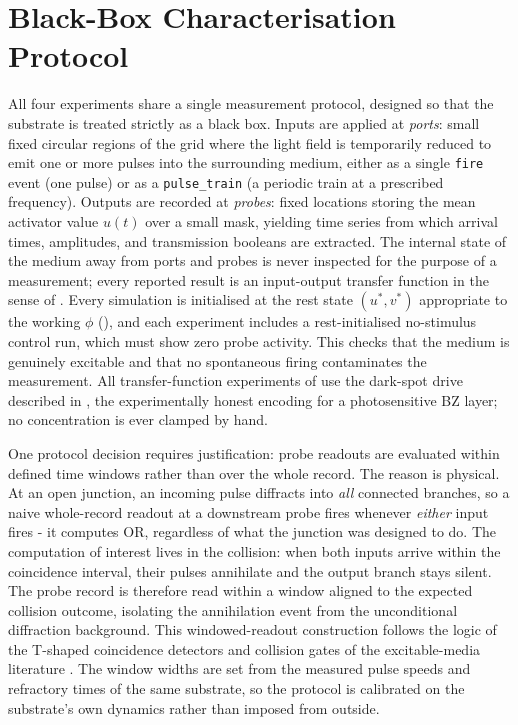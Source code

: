 \section{Black-Box Characterisation Protocol}
\label{sec:meth_protocol}

All four experiments share a single measurement protocol, designed so that the substrate is treated strictly as a black box.
Inputs are applied at \emph{ports}: small fixed circular regions of the grid where the light field is temporarily reduced to emit one or more pulses into the surrounding medium, either as a single \texttt{fire} event (one pulse) or as a \texttt{pulse\_train} (a periodic train at a prescribed frequency).
Outputs are recorded at \emph{probes}: fixed locations storing the mean activator value $u(t)$ over a small mask, yielding time series from which arrival times, amplitudes, and transmission booleans are extracted.
The internal state of the medium away from ports and probes is never inspected for the purpose of a measurement; every reported result is an input-output transfer function in the sense of .
Every simulation is initialised at the rest state $(u^{*}, v^{*})$ appropriate to the working $\phi$ (), and each experiment includes a rest-initialised no-stimulus control run, which must show zero probe activity. This checks that the medium is genuinely excitable and that no spontaneous firing contaminates the measurement.
All transfer-function experiments of  use the dark-spot drive described in , the experimentally honest encoding for a photosensitive BZ layer; no concentration is ever clamped by hand.

One protocol decision requires justification: probe readouts are evaluated within defined time windows rather than over the whole record.
The reason is physical. At an open junction, an incoming pulse diffracts into \emph{all} connected branches, so a naive whole-record readout at a downstream probe fires whenever \emph{either} input fires - it computes OR, regardless of what the junction was designed to do.
The computation of interest lives in the collision: when both inputs arrive within the coincidence interval, their pulses annihilate and the output branch stays silent.
The probe record is therefore read within a window aligned to the expected collision outcome, isolating the annihilation event from the unconditional diffraction background.
This windowed-readout construction follows the logic of the T-shaped coincidence detectors and collision gates of the excitable-media literature \cite{gorecka2003tshaped, toth1995logic}. The window widths are set from the measured pulse speeds and refractory times of the same substrate, so the protocol is calibrated on the substrate's own dynamics rather than imposed from outside.

